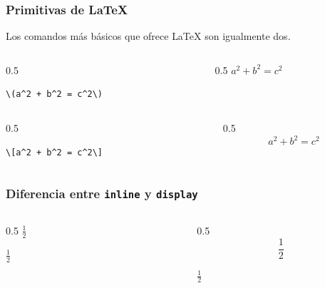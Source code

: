 \documentclass[12pt,aspectratio=169,ignorenonframetext]{ltxbeamer}
\begin{document}
\begin{frame}[fragile]
\frametitle{Primitivas de {\lmr\LaTeX}}

Los comandos más básicos que ofrece {\lmr\LaTeX} son igualmente dos.

\pause\medskip

\begin{columns}
    \begin{column}{0.5\textwidth}
        \begin{verbatim}
\(a^2 + b^2 = c^2\)
        \end{verbatim}
    \end{column}
    {\color{gray} \vline}
    \begin{column}{0.5\textwidth}
        \(a^2 + b^2 = c^2\)
    \end{column}
\end{columns}

\pause\medskip

\begin{columns}
    \begin{column}{0.5\textwidth}
        \begin{verbatim}
\[a^2 + b^2 = c^2\]
        \end{verbatim}
    \end{column}
    {\color{gray} \vline}
    \begin{column}{0.5\textwidth}
        \[a^2 + b^2 = c^2\]
    \end{column}
\end{columns}
\end{frame}





\begin{frame}[fragile]
\frametitle{Diferencia entre \texttt{inline} y \texttt{display}}

\pause\medskip

\begin{columns}
    \begin{column}{0.5\textwidth}
        \centering
        \texttt{\(\frac{1}{2}\)}\par\bigskip
        \(\frac{1}{2}\)\par
    \end{column}
    \begin{column}{0.5\textwidth}
        \centering
        \texttt{\[\frac{1}{2}\]}\par\bigskip
        \(\displaystyle\frac{1}{2}\)\par
    \end{column}
\end{columns}
\end{frame}
\end{document}
